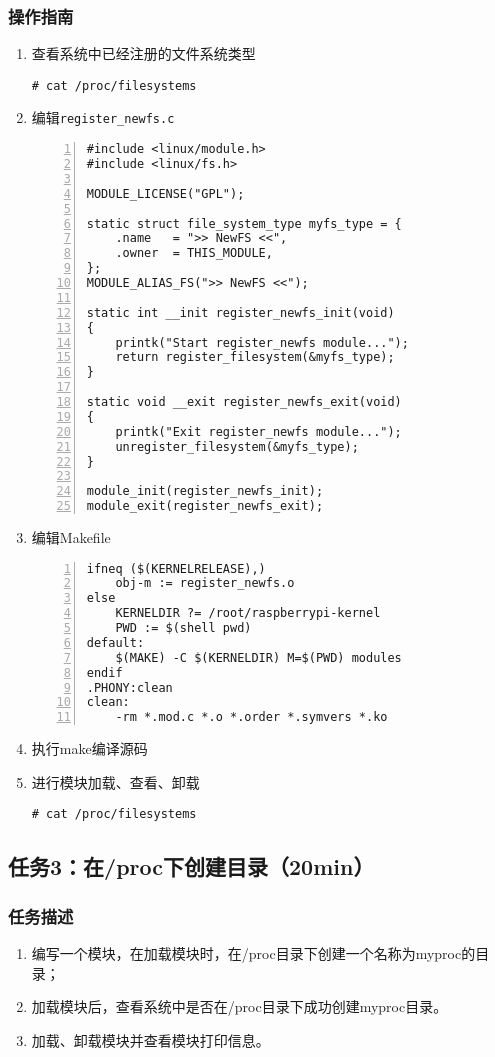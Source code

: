 \documentclass{article}
\begin{document}
\subsubsection{操作指南}
\begin{enumerate}
	\item 查看系统中已经注册的文件系统类型
	      \begin{lstlisting}
# cat /proc/filesystems
\end{lstlisting}
	\item 编辑\verb|register_newfs.c|
	      \begin{lstlisting}[numbers=left]
#include <linux/module.h>
#include <linux/fs.h>

MODULE_LICENSE("GPL");

static struct file_system_type myfs_type = {
	.name	= ">> NewFS <<",
	.owner	= THIS_MODULE,
};
MODULE_ALIAS_FS(">> NewFS <<");

static int __init register_newfs_init(void)
{
	printk("Start register_newfs module...");
	return register_filesystem(&myfs_type);
}

static void __exit register_newfs_exit(void)
{
	printk("Exit register_newfs module...");
	unregister_filesystem(&myfs_type);
}

module_init(register_newfs_init);
module_exit(register_newfs_exit);

\end{lstlisting}
	\item 编辑Makefile
	      \begin{lstlisting}[numbers=left]
ifneq ($(KERNELRELEASE),)
	obj-m := register_newfs.o
else
	KERNELDIR ?= /root/raspberrypi-kernel
	PWD := $(shell pwd)
default:
	$(MAKE) -C $(KERNELDIR) M=$(PWD) modules
endif
.PHONY:clean
clean:
	-rm *.mod.c *.o *.order *.symvers *.ko

\end{lstlisting}
	\item 执行make编译源码
	\item 进行模块加载、查看、卸载
	      \begin{lstlisting}
# cat /proc/filesystems
\end{lstlisting}
\end{enumerate}

\newpage
\subsection{任务3：在/proc下创建目录（20min）}

\subsubsection{任务描述}
\begin{enumerate}
	\item 编写一个模块，在加载模块时，在/proc目录下创建一个名称为myproc的目录；
	\item 加载模块后，查看系统中是否在/proc目录下成功创建myproc目录。
	\item 加载、卸载模块并查看模块打印信息。

\end{enumerate}
\end{document}
